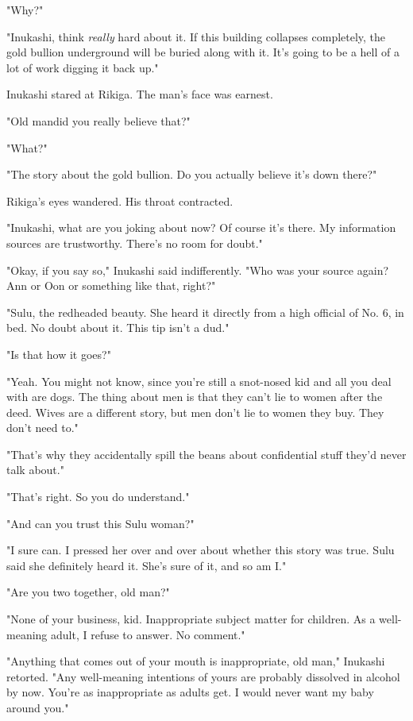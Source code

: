 "Why?"

"Inukashi, think \emph{really} hard about it. If this building collapses
completely, the gold bullion underground will be buried along with it.
It's going to be a hell of a lot of work digging it back up."

Inukashi stared at Rikiga. The man's face was earnest.

"Old man\el did you really believe that?"

"What?"

"The story about the gold bullion. Do you actually believe it's down
there?"

Rikiga's eyes wandered. His throat contracted.

"Inukashi, what are you joking about now? Of course it's there. My
information sources are trustworthy. There's no room for doubt."

"Okay, if you say so," Inukashi said indifferently. "Who was your source
again? Ann or Oon or something like that, right?"

"Sulu, the redheaded beauty. She heard it directly from a high official
of No. 6, in bed. No doubt about it. This tip isn't a dud."

"Is that how it goes?"

"Yeah. You might not know, since you're still a snot-nosed kid and all
you deal with are dogs. The thing about men is that they can't lie to
women after the deed. Wives are a different story, but men don't lie to
women they buy. They don't need to."

"That's why they accidentally spill the beans about confidential stuff
they'd never talk about."

"That's right. So you do understand."

"And can you trust this Sulu woman?"

"I sure can. I pressed her over and over about whether this story was
true. Sulu said she definitely heard it. She's sure of it, and so am I."

"Are you two together, old man?"

"None of your business, kid. Inappropriate subject matter for children.
As a well-meaning adult, I refuse to answer. No comment."

"Anything that comes out of your mouth is inappropriate, old man,"
Inukashi retorted. "Any well-meaning intentions of yours are probably
dissolved in alcohol by now. You're as inappropriate as adults get. I
would never want my baby around you."

